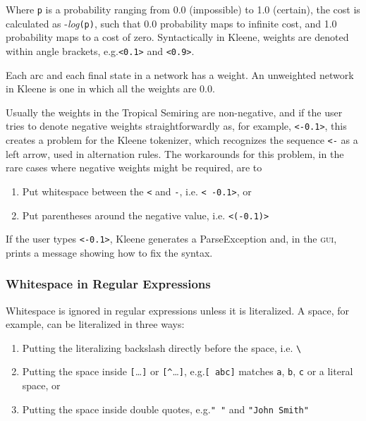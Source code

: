 \documentclass[letterpaper,12pt]{article}
\newcommand{\acro}{\textsc}
\begin{document}
\noindent
Where \texttt{p} is a probability ranging from 0.0 (impossible) to
1.0 (certain), the cost is calculated as -\emph{log}\texttt{(p)},
such that 0.0 probability maps to infinite cost, and 1.0
probability maps to a cost of zero.
Syntactically in Kleene, weights are denoted within angle brackets,
e.g.\@ \texttt{<0.1>} and \texttt{<0.9>}. 

Each arc and each final state in a network has a weight.  An unweighted
network in Kleene is one in which all the weights are 0.0.

Usually the weights in
the Tropical Semiring are non-negative, and if the user tries to
denote negative weights straightforwardly as, for example, \@ \texttt{<-0.1>}, this
creates a problem for the Kleene tokenizer, which recognizes the
sequence \texttt{<-} as a left arrow, used in alternation rules.
The workarounds for this problem, in the rare cases where negative
weights might be required,
are to

\begin{enumerate}
\item
Put whitespace between the \texttt{<} and \texttt{-}, i.e.\@
\texttt{< -0.1>}, or
\item
Put parentheses around the negative value, i.e.\@
\texttt{<(-0.1)>}
\end{enumerate}

\noindent
If the user types \texttt{<-0.1>}, Kleene generates a
ParseException and, in the \acro{gui}, prints a message showing how
to fix the syntax.


\subsubsection{Whitespace in Regular Expressions}
 
Whitespace is ignored in regular expressions unless it is
literalized.  A space, for example, can be literalized in three ways:

\begin{enumerate}
\item
Putting the literalizing backslash directly before the space, i.e.\@
\verb*!\ !
\item
Putting the space inside \verb![!\ldots\verb!]! or
\verb![^!\ldots\verb!]!, e.g.\@ \verb*![ abc]! matches \verb!a!,
\verb!b!, \verb!c! or a literal space, or
\item
Putting the space inside double quotes, e.g.\@ \verb*!" "! and
\verb*!"John Smith"!
\end{enumerate}
\end{document}
